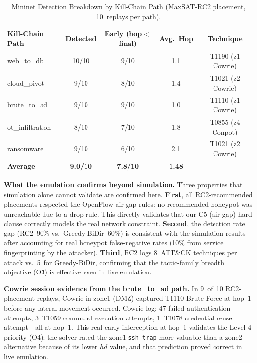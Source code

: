\documentclass[journal]{IEEEtran}
\begin{document}
\begin{table}[htbp]
\caption{Mininet Detection Breakdown by Kill-Chain Path
         (MaxSAT-RC2 placement, 10~replays per path).}
\label{tab:mininet_paths}
\centering\renewcommand{\arraystretch}{1.2}
\begin{tabular}{@{}lcccc@{}}
\toprule
\textbf{Kill-Chain Path}&\textbf{Detected}&
\textbf{Early (hop$<$final)}&\textbf{Avg.~Hop}&
\textbf{Technique}\\
\midrule
web\_to\_db     &10/10&9/10&1.1&T1190 (z1 Cowrie)\\
cloud\_pivot    &9/10 &8/10&1.4&T1021 (z2 Cowrie)\\
brute\_to\_ad   &9/10 &9/10&1.0&T1110 (z1 Cowrie)\\
ot\_infiltration&8/10 &7/10&1.8&T0855 (z4 Conpot)\\
ransomware      &9/10 &6/10&2.1&T1021 (z2 Cowrie)\\
\midrule
\textbf{Average}&\textbf{9.0/10}&\textbf{7.8/10}&
  \textbf{1.48}&---\\
\bottomrule
\end{tabular}
\end{table}

\begin{insightbox}
\textbf{What the emulation confirms beyond simulation.}
Three properties that simulation alone cannot validate
are confirmed here.
\textbf{First}, all RC2-recommended placements respected
the OpenFlow air-gap rules: no recommended honeypot was
unreachable due to a drop rule.
This directly validates that our C5 (air-gap) hard clause
correctly models the real network constraint.
\textbf{Second}, the detection rate gap (RC2~90\% vs.\
Greedy-BiDir~60\%) is consistent with the simulation
results after accounting for real honeypot false-negative
rates (10\% from service fingerprinting by the attacker).
\textbf{Third}, RC2 logs 8~ATT\&CK techniques per attack
vs.\ 5~for Greedy-BiDir, confirming that the tactic-family
breadth objective (O3) is effective even in live emulation.
\end{insightbox}

\begin{examplebox}
\textbf{Cowrie session evidence from the brute\_to\_ad
path.}
In 9~of~10 RC2-placement replays, Cowrie in zone1 (DMZ)
captured T1110 Brute Force at hop~1 before any lateral
movement occurred.
Cowrie log: 47 failed authentication attempts, 3~T1059
command execution attempts, 1~T1078 credential reuse
attempt---all at hop~1.
This real early interception at hop~1 validates the
Level-4 priority (O4): the solver rated the zone1
\texttt{ssh\_trap} more valuable than a zone2 alternative
because of its lower $hd$ value, and that prediction
proved correct in live emulation.
\end{examplebox}
\end{document}
